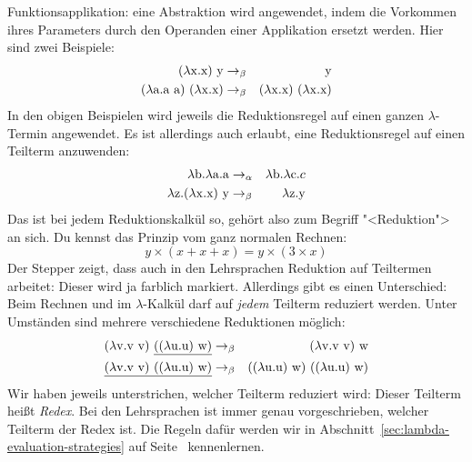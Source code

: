 Funktionsapplikation: eine Abstraktion
wird angewendet, indem die Vorkommen ihres Parameters durch den
Operanden einer Applikation ersetzt werden.  Hier sind zwei
Beispiele:
%
\begin{eqnarray*}
  (\lambda \mathrm x.\mathrm x)~\mathrm y & \rightarrow_{\beta} & \mathrm y\\
  (\lambda \mathrm a.\mathrm a~\mathrm a)~(\lambda \mathrm x.\mathrm x) & \rightarrow_{\beta}
  & (\lambda \mathrm x.\mathrm x)~(\lambda \mathrm x.\mathrm x)
\end{eqnarray*}
%
In den obigen Beispielen wird jeweils die Reduktionsregel auf einen
ganzen $\lambda$-Termin angewendet.  Es ist allerdings auch erlaubt,
eine Reduktionsregel auf einen Teilterm anzuwenden:
%
\begin{eqnarray*}
  \lambda \mathrm b.\lambda \mathrm a.\mathrm a & \rightarrow_{\alpha} & \lambda \mathrm b.\lambda \mathrm c.c\\
  \lambda \mathrm z.(\lambda \mathrm x.\mathrm x)~\mathrm y & \rightarrow_{\beta}
                                                              & \lambda \mathrm z.\mathrm y
\end{eqnarray*}
%
Das ist bei jedem Reduktionskalkül so, gehört also zum Begriff
"<Reduktion"> an sich.  Du kennst das Prinzip vom ganz normalen
Rechnen:
%
\begin{displaymath}
  y \times (x + x + x) = y \times (3\times x)
\end{displaymath}
%
Der Stepper zeigt, dass auch in den Lehrsprachen Reduktion auf
Teiltermen arbeitet: Dieser wird ja farblich markiert.  Allerdings
gibt es einen Unterschied: Beim Rechnen und im $\lambda$-Kalkül darf
auf \emph{jedem} Teilterm reduziert werden.  Unter Umständen sind
mehrere verschiedene Reduktionen möglich:
%
\begin{eqnarray*}
  (\lambda \mathrm v .\mathrm v~\mathrm v)~\underline{((\lambda \mathrm u.\mathrm u)~\mathrm w)}
  & \rightarrow_{\beta} & (\lambda \mathrm v .\mathrm v~\mathrm v)~\mathrm w\\
  \underline{(\lambda \mathrm v .\mathrm v~\mathrm v)~((\lambda \mathrm u.\mathrm u)~\mathrm w)}
  & \rightarrow_{\beta} & ((\lambda \mathrm u.\mathrm u)~\mathrm w)~((\lambda \mathrm u.\mathrm u)~\mathrm w)
\end{eqnarray*}
%
Wir haben jeweils unterstrichen, welcher Teilterm reduziert wird:
Dieser Teilterm heißt \textit{Redex}.  Bei den
Lehrsprachen ist immer genau vorgeschrieben, welcher Teilterm der
Redex ist.  Die Regeln dafür werden wir in
Abschnitt~\ref{sec:lambda-evaluation-strategies} auf
Seite~\pageref{sec:lambda-evaluation-strategies} kennenlernen.

